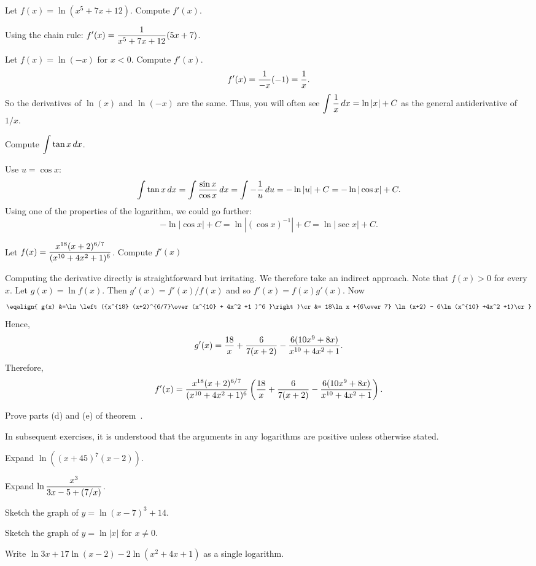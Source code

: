 \example Let $f(x) =\ln (x^5 + 7x +12) $. Compute $f'(x) $.

Using the chain rule:
$\displaystyle f'(x) = {1\over x^5 +7x+ 12}(5x+7)$.
\endexample

\example Let $f(x) =\ln (-x) $ for $x<0 $. Compute $f'(x) $.
$$f'(x) ={1\over -x}(-1) ={1\over x}.$$
So the derivatives of $\ln(x)$ and $\ln(-x)$ are the same. Thus, you
will often see $\displaystyle\int{1\over x}\,dx=\ln|x|+C$ as the general
antiderivative of $1/x$.
\endexample

\example Compute $\displaystyle\int \tan x \,dx $.

Use $u=\cos x$:
$$
\int\tan x\,dx=\int{\sin x\over\cos x}\,dx=\int -{1\over u}\,du
=-\ln |u|+C = -\ln|\cos x| +C.$$
Using one of the properties of the logarithm, we could go further:
$$-\ln|\cos x| +C=\ln|(\cos x)^{-1}|+C=\ln|\sec x|+C.$$
\vglue-20pt\endexample

\example Let $\displaystyle f(x) = {x^{18} (x+2)^{6/7}\over (x^{10} + 4x^2 +1 )^6 }$.
 Compute $f'(x) $

 Computing the derivative directly is straightforward
 but irritating. We therefore take an indirect approach. Note that
 $f(x) >0 $ for every $x$.
 Let $g(x) = \ln f(x) $. Then $g'(x) = f'(x)/f(x)$ and so 
$f'(x) =f(x)g'(x)$. Now
$$\eqalign{
g(x) &=\ln\left({x^{18} (x+2)^{6/7}\over (x^{10} + 4x^2 +1 )^6 }\right)\cr
&= 18\ln x +{6\over 7} \ln (x+2) - 6\ln (x^{10} +4x^2 +1)\cr}$$
Hence, 
$$g'(x) = {18\over x} +{6\over 7(x+2)}
-{6(10x^9 +8x )\over x^{10} +4x^2 +1 }.$$
Therefore,
$$f'(x) = {x^{18} (x+2)^{6/7}\over (x^{10} + 4x^2 +1 )^6 }
\left({18\over x} +{6\over 7(x+2)}
-{6(10x^9 +8x )\over x^{10} +4x^2 +1 }\right).$$
\vglue-20pt\endexample

\exercises

\exercise Prove parts (d) and (e) of theorem~.
\endexercise

\noindent
In subsequent exercises, it is understood that the arguments in any
logarithms are positive unless otherwise stated.

\exercise Expand $\ln ((x+45)^7 (x-2))$.
\endexercise

\exercise Expand $\displaystyle\ln {x^3\over 3x-5 +(7/x)} $.
\endexercise

\exercise Sketch the graph of $y= \ln (x-7)^3  + 14 $.
\endexercise

\exercise Sketch the graph of $y=\ln |x| $ for $x\neq 0$.
\endexercise

\exercise Write $\ln 3x + 17 \ln (x-2) -
2\ln (x^2 + 4x + 1) $ as a single logarithm.
\endexercise

